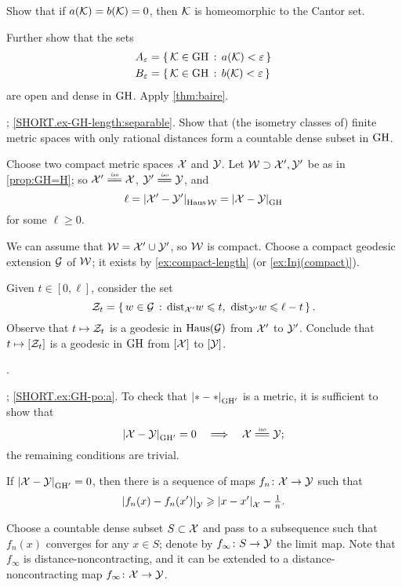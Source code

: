 Show that if $a(\mathcal{K})=b(\mathcal{K})=0$, then $\mathcal{K}$ is homeomorphic to the Cantor set.

Further show that the sets
\begin{align*}
A_\varepsilon&=\left\{\,{\mathcal{K}\in\operatorname{\rm GH}\nolimits}\,:\,{a(\mathcal{K})<\varepsilon}\,\right\}
\\
B_\varepsilon&=\left\{\,{\mathcal{K}\in\operatorname{\rm GH}\nolimits}\,:\,{b(\mathcal{K})<\varepsilon}\,\right\}
\end{align*}
are open and dense in $\operatorname{\rm GH}\nolimits$.
Apply \ref{thm:baire}.



\parbf{\ref{ex-GH-length}}; \ref{SHORT.ex-GH-length:separable}.
Show that (the isometry classes of) finite metric spaces with only rational distances form a countable dense subset in $\operatorname{\rm GH}\nolimits$. 

Choose two compact metric spaces $\mathcal{X}$ and $\mathcal{Y}$.
Let $\mathcal{W}\supset \mathcal{X}',\mathcal{Y}'$ be as in \ref{prop:GH=H};
so $\spc{X}'\iso \spc{X}$, $\spc{Y}'\iso \spc{Y}$, and
\[\ell=\dist{\spc{X}'}{\spc{Y}'}{\Haus\spc{W}}=\dist{\spc{X}}{\spc{Y}}{\GH}\]
for some $\ell\ge 0$.

We can assume that $\mathcal{W}=\mathcal{X}'\cup\mathcal{Y}'$, so $\mathcal{W}$ is compact.
Choose a compact geodesic extension $\mathcal{G}$ of $\mathcal{W}$;
it exists by \ref{ex:compact-length} (or \ref{ex:Inj(compact)}).

Given $t\in[0,\ell]$, consider the set
\[\mathcal{Z}_t=\left\{\,{w\in \mathcal{G}}\,:\,{\mathrm{dist}_{\mathcal{X}'}w\leqslant t,\  \mathrm{dist}_{\mathcal{Y}'}w\leqslant \ell-t}\,\right\}.\]
Observe that $t\mapsto \mathcal{Z}_t$ is a geodesic in $\operatorname{\rm Haus}\nolimits(\mathcal{G})$ from $\mathcal{X}'$ to $\mathcal{Y}'$.
Conclude that $t\mapsto [\mathcal{Z}_t]$ is a geodesic in $\operatorname{\rm GH}\nolimits$ from $[\mathcal{X}]$ to $[\mathcal{Y}]$.

 \cite{ivanov-nikolaeva-tuzhilin}.

\parbf{\ref{ex:GH-po}}; \ref{SHORT.ex:GH-po:a}.
To check that $\dist{*}{*}{\GH'}$ is a metric, it is sufficient to show that
\[\dist{\spc{X}}{\spc{Y}}{\GH'}=0 
\quad\Longrightarrow\quad
\spc{X}\iso\spc{Y};\]
the remaining conditions are trivial.

If $\dist{\spc{X}}{\spc{Y}}{\GH'}=0$, then there is a sequence of maps $f_n\colon\mathcal{X}\to \mathcal{Y}$ such that 
\[\dist{f_n(x)}{f_n(x')}{\spc{Y}}\ge \dist{x}{x'}{\spc{X}}-\tfrac1n.\]

Choose a countable dense subset $S\subset \mathcal{X}$ and pass to a subsequence such that $f_n(x)$ converges for any $x\in S$; denote by $f_\infty\:S\z\to \spc{Y}$ the limit map.
Note that $f_\infty$ is distance-noncontracting, and it can be extended to a distance-noncontracting map $f_\infty\colon\mathcal{X}\to \mathcal{Y}$.

